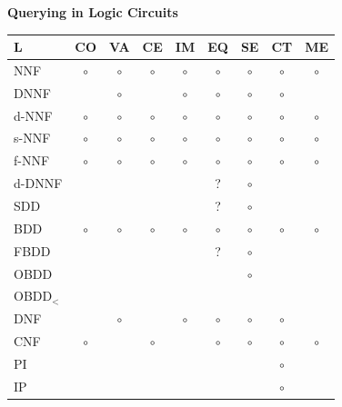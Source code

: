 \documentclass[aspectratio=169]{beamer}
\newcommand{\cmark}{\color{rightgreen}\ding{51}}%
\newcommand{\omark}{{\color{dark gray}\tiny$\bm{\circ}$}}%
\begin{document}

\begin{frame}[fragile]{\textbf{Querying in Logic Circuits}}

\begin{center}
  \scriptsize
  \begin{minipage}{0.6\textwidth}
    \begin{tabular}{l|cccccccc}
      \textbf{L} & \textbf{CO} & \textbf{VA} & \textbf{CE} & \textbf{IM} & \textbf{EQ} & \textbf{SE}
                 & \textbf{CT} & \textbf{ME}\\
      \hline
          NNF & \omark & \omark & \omark & \omark & \omark & \omark & \omark & \omark\\
         DNNF & \cmark & \omark & \cmark & \omark & \omark & \omark & \omark & \cmark\\
        d-NNF & \omark & \omark & \omark & \omark & \omark & \omark & \omark & \omark\\
        s-NNF & \omark & \omark & \omark & \omark & \omark & \omark & \omark & \omark\\
        f-NNF & \omark & \omark & \omark & \omark & \omark & \omark & \omark & \omark\\
       d-DNNF & \cmark & \cmark & \cmark & \cmark &    ?   & \omark & \cmark & \cmark\\
          SDD & \cmark & \cmark & \cmark & \cmark &    ?   & \omark & \cmark & \cmark\\
          BDD & \omark & \omark & \omark & \omark & \omark & \omark & \omark & \omark\\
         FBDD & \cmark & \cmark & \cmark & \cmark &    ?   & \omark & \cmark & \cmark\\
         OBDD & \cmark & \cmark & \cmark & \cmark & \cmark & \omark & \cmark & \cmark\\
      OBDD$_<$& \cmark & \cmark & \cmark & \cmark & \cmark & \cmark & \cmark & \cmark\\
          DNF & \cmark & \omark & \cmark & \omark & \omark & \omark & \omark & \cmark\\
          CNF & \omark & \cmark & \omark & \cmark & \omark & \omark & \omark & \omark\\
           PI & \cmark & \cmark & \cmark & \cmark & \cmark & \cmark & \omark & \cmark\\
           IP & \cmark & \cmark & \cmark & \cmark & \cmark & \cmark & \omark & \cmark\\

\end{tabular}
\end{minipage}
\end{center}
\end{frame}
\end{document}
